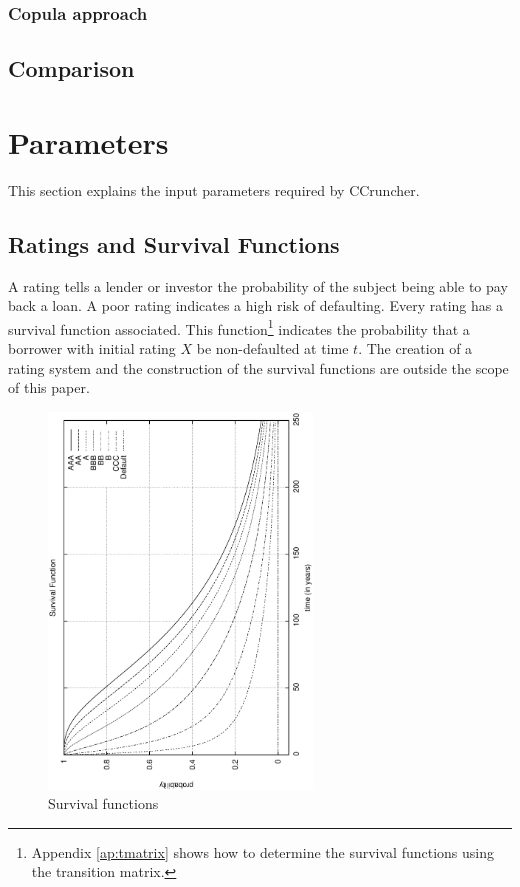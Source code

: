 \documentclass[a4paper,12pt,final]{article}
\begin{document}
\subsubsection{Copula approach}

\subsection{Comparison}



\section{Parameters}

This section explains the input parameters required by CCruncher.

\subsection{Ratings and Survival Functions}
A rating tells a lender or investor the probability of the subject being 
able to pay back a loan. A poor rating indicates a high risk of defaulting.
Every rating has a survival function associated. This function\footnote{
Appendix \ref{ap:tmatrix} shows how to determine the survival functions 
using the transition matrix.} indicates the probability that a borrower with 
initial rating $X$ be non-defaulted at time $t$. The creation of a rating 
system and the construction of the survival functions are outside the scope 
of this paper.

\begin{figure}[!hbt]
\begin{center}
\includegraphics[height=10cm, angle=-90]{./images/survival.ps}
\caption{Survival functions}
\label{survival}
\end{center}
\end{figure}
\FloatBarrier
\end{document}
